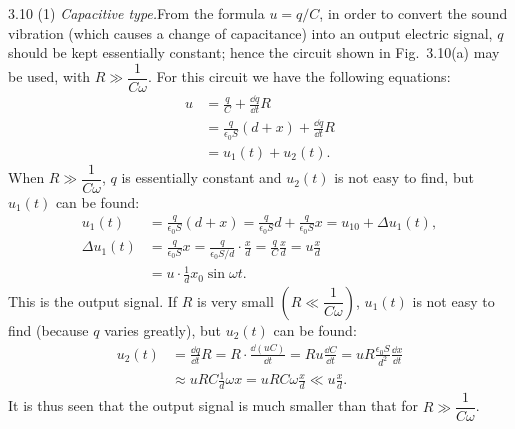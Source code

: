 \begin{solution}{3.10}
(1) \textit{Capacitive type.}\quad From the formula $u=q/C$, in order to convert the sound vibration (which causes a change of capacitance) into an output electric signal, $q$ should be kept essentially constant; hence the circuit shown in Fig.~3.10(a) may be used, with $R\gg\dfrac{1}{C\omega}$. For this circuit we have the following equations:
\begin{align*}
u&=\frac{q}{C}+\frac{\dd q}{\dd t}R\\
&=\frac{q}{\epsilon_0S}(d+x)+\frac{\dd q}{\dd t}R\\
&=u_1(t)+u_2(t).
\end{align*}
When $R\gg\dfrac{1}{C\omega}$, $q$ is essentially constant and $u_2(t)$ is not easy to find, but $u_1(t)$ can be found:
\begin{align*}
u_1(t)&=\frac{q}{\epsilon_0S}(d+x)=\frac{q}{\epsilon_0S}d+\frac{q}{\epsilon_0S}x=u_{10}+\Delta u_1(t),\\
\Delta u_1(t)&=\frac{q}{\epsilon_0S}x=\frac{q}{\epsilon_0S/d}\cdot\frac{x}{d}=\frac{q}{C}\frac{x}{d}=u\frac{x}{d}\\
&=u\cdot\frac{1}{d}x_0\sin\omega t.
\end{align*}
This is the output signal. If $R$ is very small $\left(R\ll\dfrac{1}{C\omega}\right)$, $u_1(t)$ is not easy to find (because $q$ varies greatly), but $u_2(t)$ can be found:
\begin{align*}
u_2(t)&=\frac{\dd q}{\dd t}R=R\cdot\frac{\dd(uC)}{\dd t}=Ru\frac{\dd C}{\dd t}
=uR\frac{\epsilon_0S}{d^2}\frac{\dd x}{\dd t}\\
&\approx uRC\frac{1}{d}\omega x=uRC\omega\frac{x}{d}\ll u\frac{x}{d}.
\end{align*}
It is thus seen that the output signal is much smaller than that for $R\gg\dfrac{1}{C\omega}$.


\end{solution}
